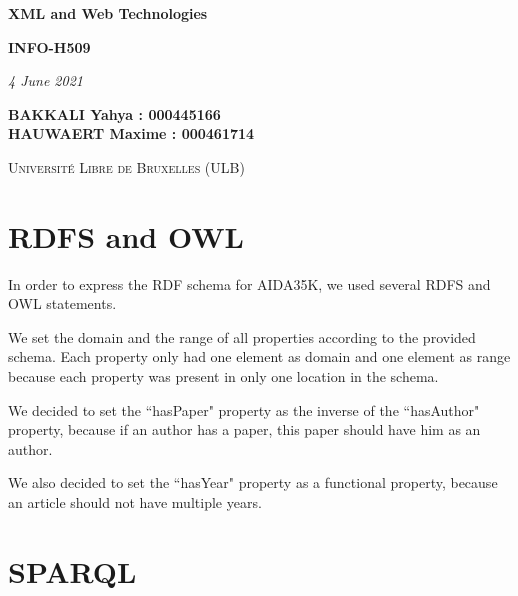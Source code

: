 \documentclass{article}[a4]
\begin{document}
\begin{titlepage}
    \begin{center}
        \vspace*{1cm}

        \Huge
        \textbf{XML and Web Technologies}
        \vspace{0.25cm}

        \LARGE
        \textbf{INFO-H509}

        \vspace{0.25cm}
        \LARGE

        \vspace{0.25cm}
        \textit{4 June 2021}

        \vspace{3cm}
           \Large
        \textbf{BAKKALI Yahya : 000445166 \\}
        \textbf{HAUWAERT Maxime : 000461714 \\}

        \vspace{2cm}

        \textsc{Université Libre de Bruxelles (ULB)}


    \end{center}
\end{titlepage}

\tableofcontents
\newpage
\setlength{\parskip}{0.9em}

\section{RDFS and OWL}

In order to express the RDF schema for AIDA35K, we used several RDFS and OWL statements. 

We set the domain and the range of all properties according to the provided schema. Each property only had one element as domain and one element as range because each property was present in only one location in the schema.

We decided to set the ``hasPaper" property as the inverse of the ``hasAuthor" property, because if an author has a paper, this paper should have him as an author.

We also decided to set the ``hasYear" property as a functional property, because an article should not have multiple years.

\section{SPARQL}
\end{document}
